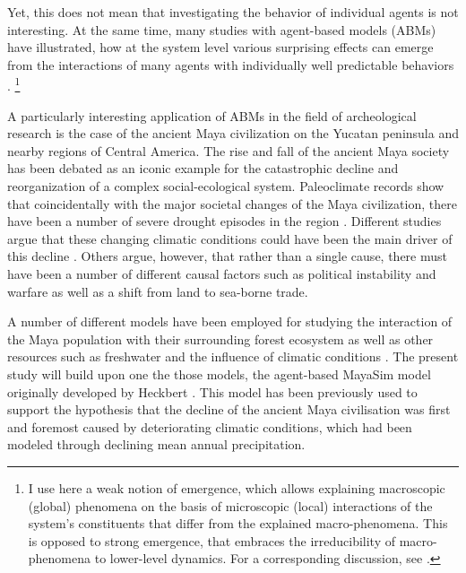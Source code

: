 Yet, this does not mean that investigating the behavior of individual agents is not interesting. At the same time, many studies with agent-based models (ABMs) have illustrated, how at the system level various surprising effects can emerge from the interactions of many agents with individually well predictable behaviors \citep{Epstein1999}. \footnote{I use here a weak notion of emergence, which allows explaining macroscopic (global) phenomena on the basis of microscopic (local) interactions of the system's constituents that differ from the explained macro-phenomena. This is opposed to strong emergence, that embraces the irreducibility of macro-phenomena to lower-level dynamics. For a corresponding discussion, see \citet{Bedau1997}.} 


A particularly interesting application of ABMs in the field of archeological research is the case of the ancient Maya civilization on the Yucatan peninsula and nearby regions of Central America. The rise and fall of the ancient Maya society has been debated as an iconic example for the catastrophic decline and reorganization of a complex social-ecological system. 
Paleoclimate records show that coincidentally with the major societal changes of the Maya civilization, there have been a number of severe drought episodes in the region \cite{Evans2018}.
Different studies argue that these changing climatic conditions could have been the main driver of this decline \citep{Medina-Elizalde2012, Kennett2012}. Others argue, however, that rather than a single cause, there must have been a number of different causal factors \citep{Masson2012} such as political instability and warfare as well as a shift from land to sea-borne trade.

A number of different models have been employed for studying the interaction of the Maya population with their surrounding forest ecosystem as well as other resources such as freshwater and the influence of climatic conditions \citep{Heckbert2013,Turner2012a, ertsen2018}. The present study will build upon one the those models, the agent-based MayaSim model originally developed by Heckbert \citep{Heckbert2013, Heckbert2013model}. This model has been previously used to support the hypothesis that the decline of the ancient Maya civilisation was first and foremost caused by deteriorating climatic conditions, which had been modeled through declining mean annual precipitation.

